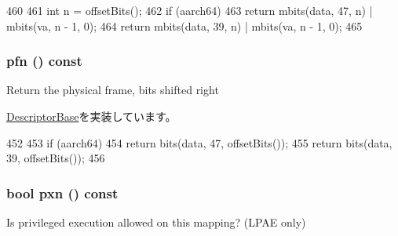 \begin{DoxyCode}
460         {
461             int n = offsetBits();
462             if (aarch64)
463                 return mbits(data, 47, n) | mbits(va, n - 1, 0);
464             return mbits(data, 39, n) | mbits(va, n - 1, 0);
465         }
\end{DoxyCode}
\hypertarget{classArmISA_1_1TableWalker_1_1LongDescriptor_ae6bfcb957f6df6777f3294e78ac298af}{
\subsubsection[{pfn}]{ pfn () const}}
\label{classArmISA_1_1TableWalker_1_1LongDescriptor_ae6bfcb957f6df6777f3294e78ac298af}
Return the physical frame, bits shifted right 

\hyperlink{classArmISA_1_1TableWalker_1_1DescriptorBase_a5e759a05b3056231f9f65a12f46c6a12}{DescriptorBase}を実装しています。


\begin{DoxyCode}
452         {
453             if (aarch64)
454                 return bits(data, 47, offsetBits());
455             return bits(data, 39, offsetBits());
456         }
\end{DoxyCode}
\hypertarget{classArmISA_1_1TableWalker_1_1LongDescriptor_a2f27c1539208f00f43df19d64c5841ff}{
\subsubsection[{pxn}]{\setlength{\rightskip}{0pt plus 5cm}bool pxn () const}}
\label{classArmISA_1_1TableWalker_1_1LongDescriptor_a2f27c1539208f00f43df19d64c5841ff}
Is privileged execution allowed on this mapping? (LPAE only) 


